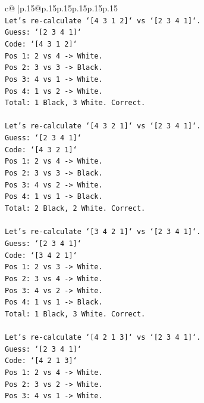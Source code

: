 \documentclass{article}
\begin{document}
{\begin{supertabular}{c@{$\;$}|p{.15\linewidth}@{}p{.15\linewidth}p{.15\linewidth}p{.15\linewidth}p{.15\linewidth}p{.15\linewidth}}
{{{\\ 
\texttt{Let's re{-}calculate `{[}4 3 1 2{]}` vs `{[}2 3 4 1{]}`.} \\
\texttt{Guess: `{[}2 3 4 1{]}`} \\
\texttt{Code: `{[}4 3 1 2{]}`} \\
\texttt{Pos 1: 2 vs 4 {-}> White.} \\
\texttt{Pos 2: 3 vs 3 {-}> Black.} \\
\texttt{Pos 3: 4 vs 1 {-}> White.} \\
\texttt{Pos 4: 1 vs 2 {-}> White.} \\
\texttt{Total: 1 Black, 3 White. Correct.} \\
\\ 
\texttt{Let's re{-}calculate `{[}4 3 2 1{]}` vs `{[}2 3 4 1{]}`.} \\
\texttt{Guess: `{[}2 3 4 1{]}`} \\
\texttt{Code: `{[}4 3 2 1{]}`} \\
\texttt{Pos 1: 2 vs 4 {-}> White.} \\
\texttt{Pos 2: 3 vs 3 {-}> Black.} \\
\texttt{Pos 3: 4 vs 2 {-}> White.} \\
\texttt{Pos 4: 1 vs 1 {-}> Black.} \\
\texttt{Total: 2 Black, 2 White. Correct.} \\
\\ 
\texttt{Let's re{-}calculate `{[}3 4 2 1{]}` vs `{[}2 3 4 1{]}`.} \\
\texttt{Guess: `{[}2 3 4 1{]}`} \\
\texttt{Code: `{[}3 4 2 1{]}`} \\
\texttt{Pos 1: 2 vs 3 {-}> White.} \\
\texttt{Pos 2: 3 vs 4 {-}> White.} \\
\texttt{Pos 3: 4 vs 2 {-}> White.} \\
\texttt{Pos 4: 1 vs 1 {-}> Black.} \\
\texttt{Total: 1 Black, 3 White. Correct.} \\
\\ 
\texttt{Let's re{-}calculate `{[}4 2 1 3{]}` vs `{[}2 3 4 1{]}`.} \\
\texttt{Guess: `{[}2 3 4 1{]}`} \\
\texttt{Code: `{[}4 2 1 3{]}`} \\
\texttt{Pos 1: 2 vs 4 {-}> White.} \\
\texttt{Pos 2: 3 vs 2 {-}> White.} \\
\texttt{Pos 3: 4 vs 1 {-}> White.} \\
}}}
\end{supertabular}}
\end{document}
